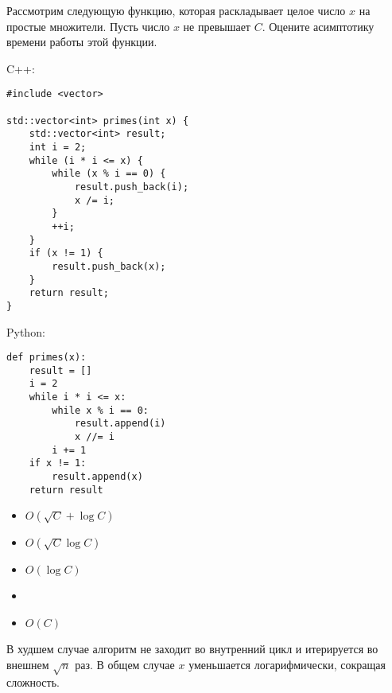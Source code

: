 \documentclass[a4paper]{article}
\begin{document}
Рассмотрим следующую функцию, которая раскладывает целое число $x$ на простые множители. Пусть число $x$ не превышает $C$. Оцените асимптотику времени работы этой функции.

\SPACE

\noindent C++:

\begin{lstlisting}[style=C++]
#include <vector>

std::vector<int> primes(int x) {
    std::vector<int> result;
    int i = 2;
    while (i * i <= x) {
        while (x % i == 0) {
            result.push_back(i);
            x /= i;
        }
        ++i;
    }
    if (x != 1) {
        result.push_back(x);
    }
    return result;
}
\end{lstlisting}

\SPACE

\noindent Python:

\begin{lstlisting}[style=Python]
def primes(x):
    result = []
    i = 2
    while i * i <= x:
        while x % i == 0:
            result.append(i)
            x //= i
        i += 1
    if x != 1:
        result.append(x)
    return result
\end{lstlisting}

\SPACE

\LINE

\SPACE

\begin{itemize}
\item $O(\sqrt{C} + \log C)$
\item $O(\sqrt{C} \log C)$
\item $O(\log C)$
\item {}
\item $O(C)$
\end{itemize}

\SPACE

\LINE

\SPACE

В худшем случае алгоритм не заходит во внутренний цикл и итерируется во внешнем $\sqrt{n}$ раз. В общем случае $x$ уменьшается логарифмически, сокращая сложность.
\end{document}

